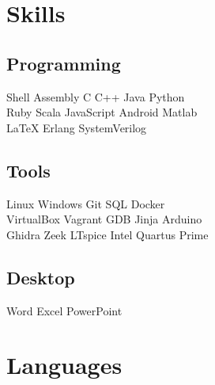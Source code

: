 \documentclass[]{deedy-resume-openfont}
\begin{document}
\begin{minipage}[t]{0.35\textwidth}

\section{Skills}
\subsection{Programming}
Shell \textbullet{} Assembly \textbullet{} C \textbullet{} C++ \textbullet{} Java \textbullet{} Python \\
Ruby \textbullet{} Scala \textbullet{} JavaScript \textbullet{} Android \textbullet{} Matlab \\
\LaTeX \textbullet{} Erlang \textbullet{} SystemVerilog

\subsection{Tools}
Linux \textbullet{} Windows \textbullet{} Git \textbullet{} SQL \textbullet{} Docker \\
VirtualBox \textbullet{} Vagrant \textbullet{} GDB \textbullet{} Jinja \textbullet{} Arduino \\
Ghidra \textbullet{} Zeek \textbullet{} LTspice \textbullet{} Intel Quartus Prime

\subsection{Desktop}
Word \textbullet{} Excel \textbullet{} PowerPoint

\section{Languages}


\end{minipage}
\end{document}
